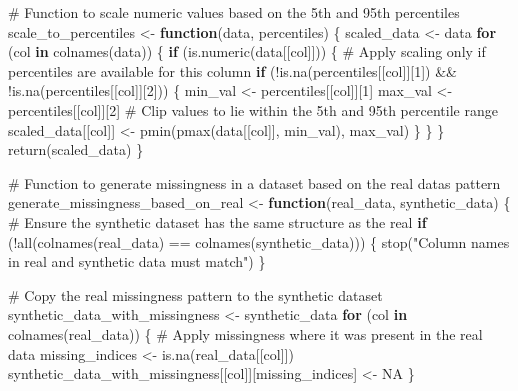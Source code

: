 \documentclass[
  letterpaper,
  DIV=11,
  numbers=noendperiod]{scrartcl}
\newenvironment{Shaded}{\begin{snugshade}}{\end{snugshade}}
\newcommand{\CommentTok}[1]{\textcolor[rgb]{0.37,0.37,0.37}{#1}}
\newcommand{\ConstantTok}[1]{\textcolor[rgb]{0.56,0.35,0.01}{#1}}
\newcommand{\ControlFlowTok}[1]{\textcolor[rgb]{0.00,0.23,0.31}{\textbf{#1}}}
\newcommand{\DecValTok}[1]{\textcolor[rgb]{0.68,0.00,0.00}{#1}}
\newcommand{\FunctionTok}[1]{\textcolor[rgb]{0.28,0.35,0.67}{#1}}
\newcommand{\NormalTok}[1]{\textcolor[rgb]{0.00,0.23,0.31}{#1}}
\newcommand{\OtherTok}[1]{\textcolor[rgb]{0.00,0.23,0.31}{#1}}
\newcommand{\SpecialCharTok}[1]{\textcolor[rgb]{0.37,0.37,0.37}{#1}}
\newcommand{\StringTok}[1]{\textcolor[rgb]{0.13,0.47,0.30}{#1}}
\begin{document}
\begin{Shaded}
\begin{Highlighting}[]
\CommentTok{\# Function to scale numeric values based on the 5th and 95th percentiles}
\NormalTok{scale\_to\_percentiles }\OtherTok{\textless{}{-}} \ControlFlowTok{function}\NormalTok{(data, percentiles) \{}
\NormalTok{  scaled\_data }\OtherTok{\textless{}{-}}\NormalTok{ data}
  \ControlFlowTok{for}\NormalTok{ (col }\ControlFlowTok{in} \FunctionTok{colnames}\NormalTok{(data)) \{}
    \ControlFlowTok{if}\NormalTok{ (}\FunctionTok{is.numeric}\NormalTok{(data[[col]])) \{}
      \CommentTok{\# Apply scaling only if percentiles are available for this column}
      \ControlFlowTok{if}\NormalTok{ (}\SpecialCharTok{!}\FunctionTok{is.na}\NormalTok{(percentiles[[col]][}\DecValTok{1}\NormalTok{]) }\SpecialCharTok{\&\&} \SpecialCharTok{!}\FunctionTok{is.na}\NormalTok{(percentiles[[col]][}\DecValTok{2}\NormalTok{])) \{}
\NormalTok{        min\_val }\OtherTok{\textless{}{-}}\NormalTok{ percentiles[[col]][}\DecValTok{1}\NormalTok{]}
\NormalTok{        max\_val }\OtherTok{\textless{}{-}}\NormalTok{ percentiles[[col]][}\DecValTok{2}\NormalTok{]}
        \CommentTok{\# Clip values to lie within the 5th and 95th percentile range}
\NormalTok{        scaled\_data[[col]] }\OtherTok{\textless{}{-}} \FunctionTok{pmin}\NormalTok{(}\FunctionTok{pmax}\NormalTok{(data[[col]], min\_val), max\_val)}
\NormalTok{      \}}
\NormalTok{    \}}
\NormalTok{  \}}
  \FunctionTok{return}\NormalTok{(scaled\_data)}
\NormalTok{\}}

\CommentTok{\# Function to generate missingness in a dataset based on the real data\textquotesingle{}s pattern}
\NormalTok{generate\_missingness\_based\_on\_real }\OtherTok{\textless{}{-}} \ControlFlowTok{function}\NormalTok{(real\_data, synthetic\_data) \{}
  \CommentTok{\# Ensure the synthetic dataset has the same structure as the real}
  \ControlFlowTok{if}\NormalTok{ (}\SpecialCharTok{!}\FunctionTok{all}\NormalTok{(}\FunctionTok{colnames}\NormalTok{(real\_data) }\SpecialCharTok{==} \FunctionTok{colnames}\NormalTok{(synthetic\_data))) \{}
    \FunctionTok{stop}\NormalTok{(}\StringTok{"Column names in real and synthetic data must match"}\NormalTok{)}
\NormalTok{  \}}
  
  \CommentTok{\# Copy the real missingness pattern to the synthetic dataset}
\NormalTok{  synthetic\_data\_with\_missingness }\OtherTok{\textless{}{-}}\NormalTok{ synthetic\_data}
  \ControlFlowTok{for}\NormalTok{ (col }\ControlFlowTok{in} \FunctionTok{colnames}\NormalTok{(real\_data)) \{}
    \CommentTok{\# Apply missingness where it was present in the real data}
\NormalTok{    missing\_indices }\OtherTok{\textless{}{-}} \FunctionTok{is.na}\NormalTok{(real\_data[[col]])}
\NormalTok{    synthetic\_data\_with\_missingness[[col]][missing\_indices] }\OtherTok{\textless{}{-}} \ConstantTok{NA}
\NormalTok{  \}}
  

\end{Highlighting}
\end{Shaded}
\end{document}
